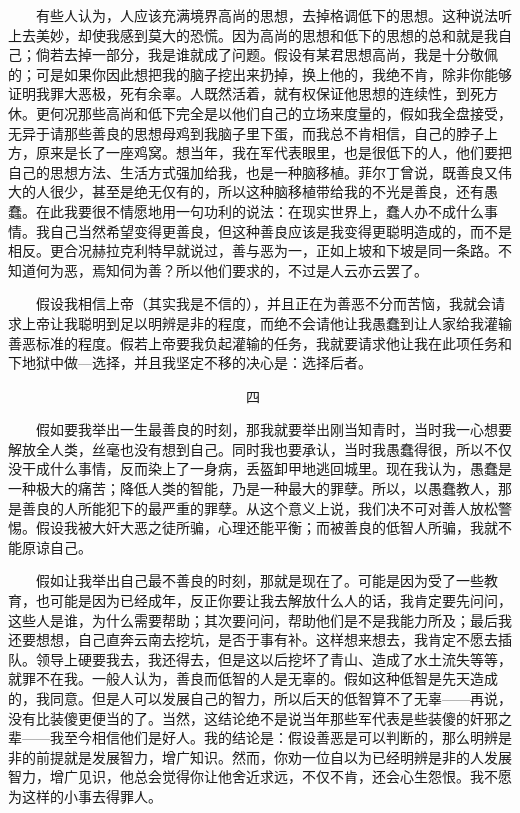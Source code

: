 　　有些人认为，人应该充满境界高尚的思想，去掉格调低下的思想。这种说法听上去美妙，却使我感到莫大的恐慌。因为高尚的思想和低下的思想的总和就是我自己；倘若去掉一部分，我是谁就成了问题。假设有某君思想高尚，我是十分敬佩的；可是如果你因此想把我的脑子挖出来扔掉，换上他的，我绝不肯，除非你能够证明我罪大恶极，死有余辜。人既然活着，就有权保证他思想的连续性，到死方休。更何况那些高尚和低下完全是以他们自己的立场来度量的，假如我全盘接受，无异于请那些善良的思想母鸡到我脑子里下蛋，而我总不肯相信，自己的脖子上方，原来是长了一座鸡窝。想当年，我在军代表眼里，也是很低下的人，他们要把自己的思想方法、生活方式强加给我，也是一种脑移植。菲尔丁曾说，既善良又伟大的人很少，甚至是绝无仅有的，所以这种脑移植带给我的不光是善良，还有愚蠢。在此我要很不情愿地用一句功利的说法：在现实世界上，蠢人办不成什么事情。我自己当然希望变得更善良，但这种善良应该是我变得更聪明造成的，而不是相反。更合况赫拉克利特早就说过，善与恶为一，正如上坡和下坡是同一条路。不知道何为恶，焉知伺为善？所以他们要求的，不过是人云亦云罢了。 

　　假设我相信上帝（其实我是不信的），并且正在为善恶不分而苦恼，我就会请求上帝让我聪明到足以明辨是非的程度，而绝不会请他让我愚蠢到让人家给我灌输善恶标准的程度。假若上帝要我负起灌输的任务，我就要请求他让我在此项任务和下地狱中做—选择，并且我坚定不移的决心是：选择后者。 


　　　　　　　　　　　　　　　　　四　　　　　　　　　　　　　　　　　 

　　假如要我举出一生最善良的时刻，那我就要举出刚当知青时，当时我一心想要解放全人类，丝毫也没有想到自己。同时我也要承认，当时我愚蠢得很，所以不仅没干成什么事情，反而染上了一身病，丢盔卸甲地逃回城里。现在我认为，愚蠢是一种极大的痛苦；降低人类的智能，乃是一种最大的罪孽。所以，以愚蠢教人，那是善良的人所能犯下的最严重的罪孽。从这个意义上说，我们决不可对善人放松警惕。假设我被大奸大恶之徒所骗，心理还能平衡；而被善良的低智人所骗，我就不能原谅自己。 

　　假如让我举出自己最不善良的时刻，那就是现在了。可能是因为受了一些教育，也可能是因为已经成年，反正你要让我去解放什么人的话，我肯定要先问问，这些人是谁，为什么需要帮助；其次要问问，帮助他们是不是我能力所及；最后我还要想想，自己直奔云南去挖坑，是否于事有补。这样想来想去，我肯定不愿去插队。领导上硬要我去，我还得去，但是这以后挖坏了青山、造成了水土流失等等，就罪不在我。一般人认为，善良而低智的人是无辜的。假如这种低智是先天造成的，我同意。但是人可以发展自己的智力，所以后天的低智算不了无辜——再说，没有比装傻更便当的了。当然，这结论绝不是说当年那些军代表是些装傻的奸邪之辈——我至今相信他们是好人。我的结论是：假设善恶是可以判断的，那么明辨是非的前提就是发展智力，增广知识。然而，你劝一位自以为已经明辨是非的人发展智力，增广见识，他总会觉得你让他舍近求远，不仅不肯，还会心生怨恨。我不愿为这样的小事去得罪人。 

